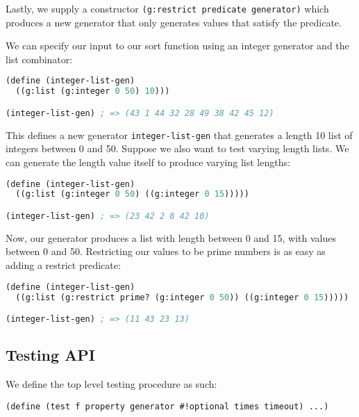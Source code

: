 Lastly, we supply a constructor \verb|(g:restrict predicate generator)| which produces a new generator that only generates values that satisfy the predicate.

We can specify our input to our sort function using an integer generator and the list combinator:
\begin{lstlisting}[language=lisp]
(define (integer-list-gen)
  ((g:list (g:integer 0 50) 10)))

(integer-list-gen) ; => (43 1 44 32 28 49 38 42 45 12)
\end{lstlisting}

This defines a new generator \verb|integer-list-gen| that generates a length 10 list of integers between 0 and 50. Suppose we also want to test varying length lists. We can generate the length value itself to produce varying list lengths:

\begin{lstlisting}[language=lisp]
(define (integer-list-gen)
  ((g:list (g:integer 0 50) ((g:integer 0 15)))))

(integer-list-gen) ; => (23 42 2 8 42 10)
\end{lstlisting}

Now, our generator produces a list with length between 0 and 15, with values between 0 and 50. Restricting our values to be prime numbers is as easy as adding a restrict predicate:

\begin{lstlisting}[language=lisp]
(define (integer-list-gen)
  ((g:list (g:restrict prime? (g:integer 0 50)) ((g:integer 0 15)))))

(integer-list-gen) ; => (11 43 23 13)
\end{lstlisting}

\subsection{Testing API}

We define the top level testing procedure as such:
\begin{lstlisting}
(define (test f property generator #!optional times timeout) ...)
\end{lstlisting}

